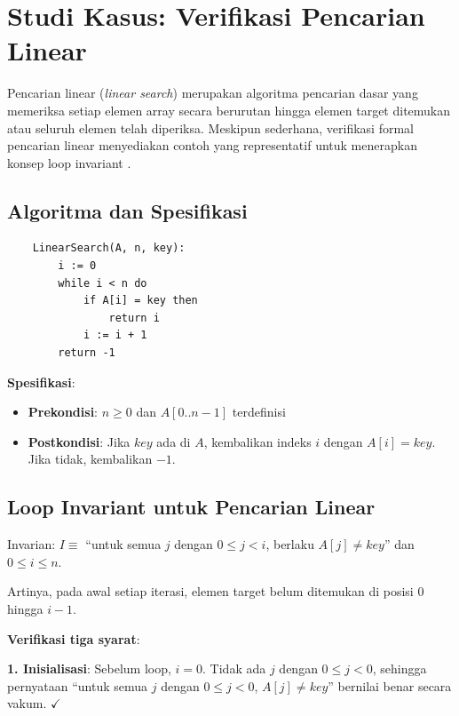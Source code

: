 \section{Studi Kasus: Verifikasi Pencarian Linear}

Pencarian linear (\textit{linear search}) merupakan algoritma pencarian dasar yang memeriksa setiap elemen array secara berurutan hingga elemen target ditemukan atau seluruh elemen telah diperiksa. Meskipun sederhana, verifikasi formal pencarian linear menyediakan contoh yang representatif untuk menerapkan konsep loop invariant \cite{rosen2019}.

\subsection{Algoritma dan Spesifikasi}

\begin{verbatim}
    LinearSearch(A, n, key):
        i := 0
        while i < n do
            if A[i] = key then
                return i
            i := i + 1
        return -1
\end{verbatim}

\textbf{Spesifikasi}:
\begin{itemize}
    \item \textbf{Prekondisi}: $n \geq 0$ dan $A[0..n-1]$ terdefinisi
    \item \textbf{Postkondisi}: Jika $key$ ada di $A$, kembalikan indeks $i$ dengan $A[i] = key$. Jika tidak, kembalikan $-1$.
\end{itemize}

\subsection{Loop Invariant untuk Pencarian Linear}

\begin{definisi}
Invarian: $I \equiv$ ``untuk semua $j$ dengan $0 \leq j < i$, berlaku $A[j] \neq key$'' dan $0 \leq i \leq n$.

Artinya, pada awal setiap iterasi, elemen target belum ditemukan di posisi $0$ hingga $i-1$.
\end{definisi}

\textbf{Verifikasi tiga syarat}:

\textbf{1. Inisialisasi}: Sebelum loop, $i = 0$. Tidak ada $j$ dengan $0 \leq j < 0$, sehingga pernyataan ``untuk semua $j$ dengan $0 \leq j < 0$, $A[j] \neq key$'' bernilai benar secara vakum. $\checkmark$

